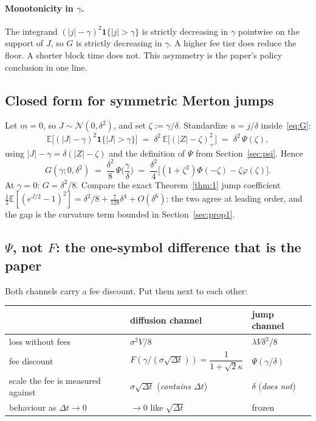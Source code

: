 \documentclass[11pt]{article}
\theoremstyle{definition}
\theoremstyle{remark}
\newcommand{\E}{\mathbb{E}}
\newcommand{\dt}{\Delta t}
\newcommand{\1}{\mathbf{1}}
\begin{document}
\paragraph{Monotonicity in $\gamma$.} The integrand $(|j|-\gamma)^2\1\{|j|>\gamma\}$ is strictly decreasing in $\gamma$ pointwise on the support of $J$, so $G$ is strictly decreasing in $\gamma$. A higher fee tier does reduce the floor. A shorter block time does not. This asymmetry is the paper's policy conclusion in one line.

\subsection{Closed form for symmetric Merton jumps}

Let $m = 0$, so $J \sim \mathcal N(0,\delta^2)$, and set $\zeta := \gamma/\delta$. Standardize $u = j/\delta$ inside~\eqref{eq:G}:
\[
\E\big[(|J|-\gamma)^2\1\{|J|>\gamma\}\big]
\;=\; \delta^2\,\E\big[(|Z| - \zeta)_+^2\big]
\;=\; \delta^2\,\Psi(\zeta),
\]
using $|J| - \gamma = \delta(|Z| - \zeta)$ and the definition of $\Psi$ from Section~\ref{sec:psi}. Hence
\begin{equation}\label{eq:Gclosed}
\boxed{\;G(\gamma;0,\delta^2) \;=\; \frac{\delta^2}{8}\,\Psi\!\Big(\frac{\gamma}{\delta}\Big) \;=\; \frac{\delta^2}{4}\Big[(1+\zeta^2)\Phi(-\zeta) - \zeta\varphi(\zeta)\Big]. \;}
\end{equation}
At $\gamma = 0$: $G = \delta^2/8$. Compare the exact Theorem~\ref{thm:1} jump coefficient $\tfrac12\E[(e^{J/2}-1)^2] = \delta^2/8 + \tfrac{7}{128}\delta^4 + O(\delta^6)$: the two agree at leading order, and the gap is the curvature term bounded in Section~\ref{sec:prop1}.

\subsection{\texorpdfstring{$\Psi$}{Psi}, not \texorpdfstring{$F$}{F}: the one-symbol difference that is the paper}

Both channels carry a fee discount. Put them next to each other:
\begin{center}
\begin{tabular}{lll}
\toprule
& diffusion channel & jump channel \\
\midrule
loss without fees & $\sigma^2 V/8$ & $\lambda V\delta^2/8$ \\
fee discount & $F(\gamma/(\sigma\sqrt{\dt})) = \dfrac{1}{1+\sqrt2\kappa}$ & $\Psi(\gamma/\delta)$ \\[6pt]
scale the fee is measured against & $\sigma\sqrt{\dt}$ \;\; (\emph{contains $\dt$}) & $\delta$ \;\; (\emph{does not}) \\
behaviour as $\dt \to 0$ & $\to 0$ like $\sqrt{\dt}$ & frozen \\
\bottomrule
\end{tabular}
\end{center}
\end{document}
